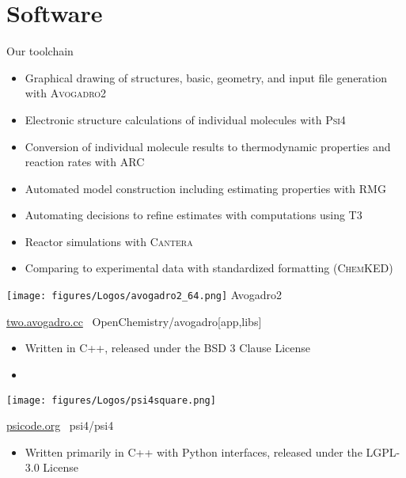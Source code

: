 \section{Software}

\begin{frame}{Our toolchain}
 \begin{itemize}
  \item Graphical drawing of structures, basic, geometry, and input file generation with \textsc{Avogadro2}
  \item Electronic structure calculations of individual molecules with \textsc{Psi4}
  \item Conversion of individual molecule results to thermodynamic properties and reaction rates with \textsc{ARC} %
  \item Automated model construction including estimating properties with \textsc{RMG}
  \item Automating decisions to refine estimates with computations using \textsc{T3}
  \item Reactor simulations with \textsc{Cantera}
  \item Comparing to experimental data with standardized formatting (\textsc{ChemKED})
 \end{itemize}
\end{frame}

\begin{frame}{
 \hspace{-5mm}
 \texttt{[image: figures/Logos/avogadro2\_64.png]}
 Avogadro2
}

\url{two.avogadro.cc}
\hspace{10mm}
\ghinlinelogo\ OpenChemistry/avogadro[app,libs]

\vspace{5mm}

 \begin{itemize}
 \item Written in C++, released under the BSD 3 Clause License
 \item 
\end{itemize}
\end{frame}

\begin{frame}{
 \hspace{-5mm}
 \texttt{[image: figures/Logos/psi4square.png]}
}

\url{psicode.org}
\hspace{10mm}
\ghinlinelogo\ psi4/psi4

\vspace{5mm}

\begin{itemize}
 \item Written primarily in C++ with Python interfaces, released under the LGPL-3.0 License
\end{itemize}
\end{frame}

